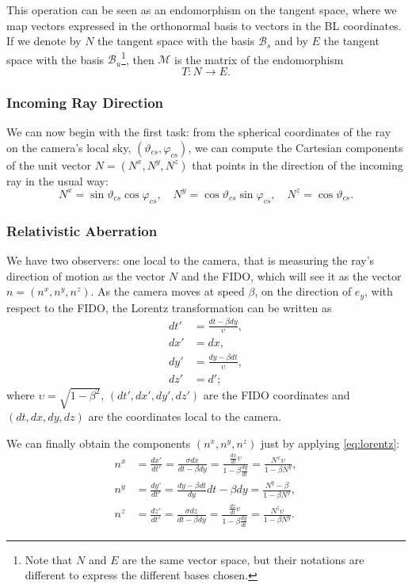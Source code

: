 This operation can be seen as an endomorphism on the tangent space, where we map vectors expressed in the orthonormal basis to vectors in the \ac{BL} coordinates. If we denote by $N$ the tangent space with the basis $\mathcal{B}_s$ and by $E$ the tangent space with the basis $\mathcal{B}_u$\footnote{Note that $N$ and $E$ are the same vector space, but their notations are different to express the different bases chosen.}, then $\mathcal{M}$ is the matrix of the endomorphism \[T \colon N \to E.\]

\subsubsection*{Incoming Ray Direction}

We can now begin with the first task: from the spherical coordinates of the ray on the camera's local sky, $(\vartheta_{cs}, \varphi_{cs})$, we can compute the Cartesian components of the unit vector $N = (N^x, N^y, N^z)$ that points in the direction of the incoming ray in the usual way:
\begin{equation}
N^x = \sin\vartheta_{cs} \cos\varphi_{cs}, \quad N^y = \cos\vartheta_{cs} \sin\varphi_{cs}, \quad N^z = \cos\vartheta_{cs}.
\end{equation}

\subsubsection*{Relativistic Aberration}

We have two observers: one local to the camera, that is measuring the ray's direction of motion as the vector $N$ and the \ac{FIDO}, which will see it as the vector $n = (n^x, n^y, n^z)$. As the camera moves at speed $\beta$, on the direction of $e_y$, with respect to the \ac{FIDO}, the Lorentz transformation can be written as
\begin{align}
\label{eq:lorentz}
dt' &= \frac{dt - \beta dy}{\upsilon}, \\ \nonumber
dx' &= dx, \\ \nonumber
dy' &= \frac{dy - \beta dt}{\upsilon}, \\ \nonumber
dz' &= d';
\end{align}
where $\upsilon = \sqrt{1 - \beta^2}$, $(dt', dx', dy', dz')$ are the \ac{FIDO} coordinates and $(dt, dx, dy, dz)$ are the coordinates local to the camera.

We can finally obtain the components $(n^x, n^y, n^z)$ just by applying \autoref{eq:lorentz}:
\begin{align*}
n^x &= \frac{dx'}{dt'} = \frac{\sigma dx}{dt - \beta dy} = \frac{\frac{dx}{dt} \upsilon}{1 - \beta \frac{dy}{dt}} = \frac{N^x \upsilon}{1 - \beta N^y}, \\
n^y &= \frac{dy'}{dt'} = \frac{dy - \beta dt}{dy}{dt - \beta dy} = \frac{N^y - \beta}{1 - \beta N^y}, \\
n^z &= \frac{dz'}{dt'} = \frac{\sigma dz}{dt - \beta dy} = \frac{\frac{dz}{dt} \upsilon}{1 - \beta \frac{dy}{dt}} = \frac{N^z \upsilon}{1 - \beta N^y}.
\end{align*}

